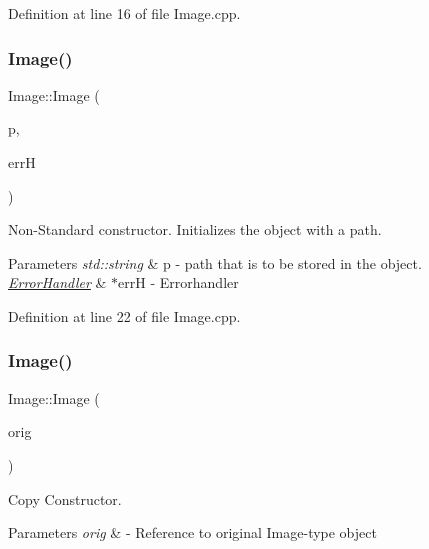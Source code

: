 Definition at line 16 of file Image.\+cpp.

\mbox{\label{classImage_ae17a70dac9941346eab9e5abef1c03c7}} 
\subsubsection{\texorpdfstring{Image()}{Image()}\hspace{0.1cm}{\footnotesize\ttfamily [2/3]}}
{\footnotesize\ttfamily Image\+::\+Image (\begin{DoxyParamCaption}\item[{std\+::string}]{p,  }\item[{\mbox{\hyperlink{classErrorHandler}{Error\+Handler}} $\ast$}]{errH }\end{DoxyParamCaption})}



Non-\/\+Standard constructor. Initializes the object with a path. 


\begin{DoxyParams}{Parameters}
{\em std\+::string} & p -\/ path that is to be stored in the object. \\
\hline
{\em \mbox{\hyperlink{classErrorHandler}{Error\+Handler}}} & $\ast$errH -\/ Errorhandler \\
\hline
\end{DoxyParams}


Definition at line 22 of file Image.\+cpp.

\mbox{\label{classImage_abda271aa11b907dda8c8c8176684227d}} 
\subsubsection{\texorpdfstring{Image()}{Image()}\hspace{0.1cm}{\footnotesize\ttfamily [3/3]}}
{\footnotesize\ttfamily Image\+::\+Image (\begin{DoxyParamCaption}\item[{const \mbox{\hyperlink{classImage}{Image}} \&}]{orig }\end{DoxyParamCaption})}



Copy Constructor. 


\begin{DoxyParams}{Parameters}
{\em orig} & -\/ Reference to original Image-\/type object \\
\hline
\end{DoxyParams}


